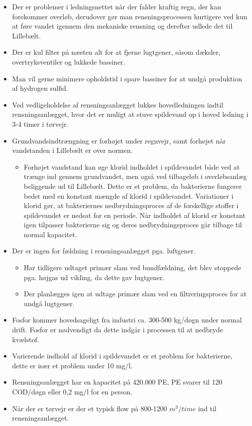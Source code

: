 \begin{itemize}
	\item Der er problemer i ledningsnettet når der falder kraftig regn, der kan forekommer overløb, derudover gør man rensningsprocessen hurtigere ved kun at føre vandet igennem den mekaniske rensning og derefter udlede det til Lillebælt. 
	\item Der er kul filter på næsten alt for at fjerne lugtgener, såsom dæksler, overtryksventiler og lukkede bassiner. 
	\item Man vil gerne minimere opholdstid i spare bassiner for at undgå produktion af hydrogen sulfid. 
	\item Ved vedligeholdelse af rensningsanlægget lukkes hovedledningen indtil rensningsanlægget, hvor det er muligt at stuve spildevand op i hoved ledning i 3-4 timer i tørvejr.
	\item Grundvandsindtrængning er forhøjet under regnvejr, samt forhøjet når vandstanden i Lillebælt er over normen.
	\begin{itemize}
		\item Forhøjet vandstand kan øge klorid indholdet i spildevandet både ved at trænge ind gennem grundvandet, men også ved tilbageløb i overløbsanlæg beliggende ud til Lillebælt. Dette er et problem, da bakterierne fungerer bedst med en konstant mængde af klorid i spildevandet. Variationer i klorid gør, at bakteriernes nedbrydningsproces af de forskellige stoffer i spildevandet er nedsat for en periode. Når indholdet af klorid er konstant igen tilpasser bakterierne sig og deres nedbrydningsproces går tilbage til normal kapacitet.
	\end{itemize}
	\item Der er ingen for fældning i rensningsanlægget pga. luftgener. 
	\begin{itemize}
		\item Har tidligere udtaget primær slam ved bundfældning, det blev stoppede pga. højgas ud vikling, da dette gav lugtgener.
		\item Der planlægges igen at udtage primær slam ved en filtreringsproces for at undgå lugtgener.
	\end{itemize}
	\item Fosfor kommer hovedsageligt fra industri ca. 300-500 kg/døgn under normal drift. Fosfor er nødvendigt da dette indgår i processen til at nedbryde kvælstof.
	\item Varierende indhold af klorid i spildevandet er et problem for bakterierne, dette er især et problem under 10 mg/l.
	\item Rensningsanlægget har en kapacitet på 420.000 PE, PE svarer til 120 COD/døgn eller 0,2 mg/l for en person.
	\item Når der er tørvejr er der et typisk flow på 800-1200 $m^3/time$ ind til rensningsanlægget.
\end{itemize}
